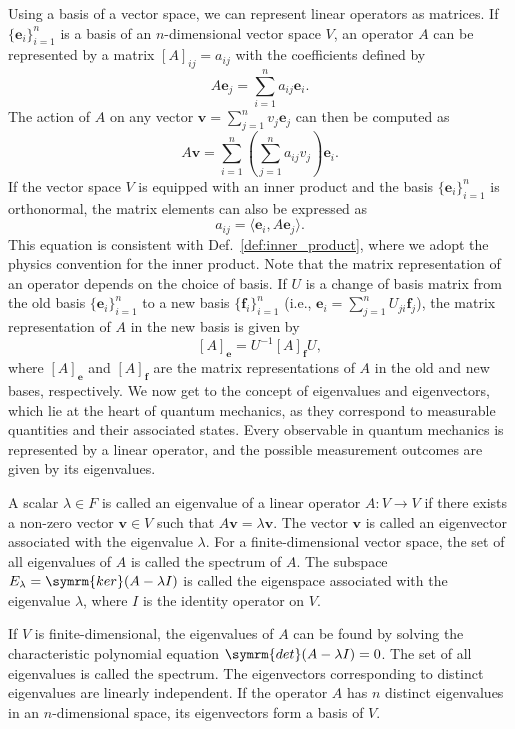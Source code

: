 Using a basis of a vector space, we can represent linear operators as matrices. If $\lbrace\symbf{e}_i\rbrace_{i=1}^n$ is a basis of an $n$-dimensional vector space $V$, an operator $A$ can be represented by a matrix $[A]_{ij}=a_{ij}$ with the coefficients defined by
\begin{equation}
A\symbf{e}_j=\sum_{i=1}^n a_{ij}\symbf{e}_i.
\end{equation}
The action of $A$ on any vector $\symbf{v}=\sum_{j=1}^n v_j\symbf{e}_j$ can then be computed as
\begin{equation}
A\symbf{v}=\sum_{i=1}^n\left(\sum_{j=1}^n a_{ij}v_j\right)\symbf{e}_i.
\end{equation}
If the vector space $V$ is equipped with an inner product and the basis $\lbrace\symbf{e}_i\rbrace_{i=1}^n$ is orthonormal, the matrix elements can also be expressed as
\begin{equation}
a_{ij}=\langle\symbf{e}_i,A\symbf{e}_j\rangle.
\end{equation}
This equation is consistent with Def.~\ref{def:inner_product}, where we adopt the physics convention for the inner product. Note that the matrix representation of an operator depends on the choice of basis. If $U$ is a change of basis matrix from the old basis $\lbrace\symbf{e}_i\rbrace_{i=1}^n$ to a new basis $\lbrace\symbf{f}_i\rbrace_{i=1}^n$ (i.e., $\symbf{e}_i=\sum_{j=1}^n U_{ji}\symbf{f}_j$), the matrix representation of $A$ in the new basis is given by
\begin{equation}\label{eq:change_of_basis}
[A]_{\symbf{e}}=U^{-1}[A]_{\symbf{f}}U,
\end{equation}
where $[A]_{\symbf{e}}$ and $[A]_{\symbf{f}}$ are the matrix representations of $A$ in the old and new bases, respectively. We now get to the concept of eigenvalues and eigenvectors, which lie at the heart of quantum mechanics, as they correspond to measurable quantities and their associated states. Every observable in quantum mechanics is represented by a linear operator, and the possible measurement outcomes are given by its eigenvalues.
\begin{definition}
A scalar $\lambda\in F$ is called an eigenvalue of a linear operator $A:V\to V$ if there exists a non-zero vector $\symbf{v}\in V$ such that $A\symbf{v}=\lambda\symbf{v}$. The vector $\symbf{v}$ is called an eigenvector associated with the eigenvalue $\lambda$. For a finite-dimensional vector space, the set of all eigenvalues of $A$ is called the spectrum of $A$. The subspace $E_\lambda=\symrm{ker}(A-\lambda I)$ is called the eigenspace associated with the eigenvalue $\lambda$, where $I$ is the identity operator on $V$.
\end{definition}
If $V$ is finite-dimensional, the eigenvalues of $A$ can be found by solving the characteristic polynomial equation $\symrm{det}(A-\lambda I)=0$. The set of all eigenvalues is called the spectrum. The eigenvectors corresponding to distinct eigenvalues are linearly independent. If the operator $A$ has $n$ distinct eigenvalues in an $n$-dimensional space, its eigenvectors form a basis of $V$.

